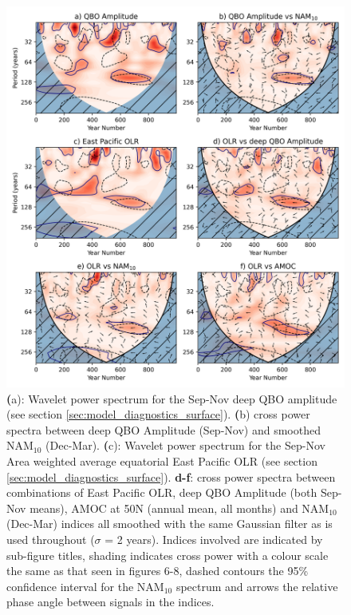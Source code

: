 \begin{figure}[h!]
\begin{center}
\noindent\includegraphics[width = 0.7\linewidth]{Figures/Figures-surface/OLR_wavelet.png}
\caption{\textbf(a): Wavelet power spectrum for the Sep-Nov deep QBO amplitude (see section \ref{sec:model_diagnostics_surface}). \textbf(b) cross power spectra between deep QBO Amplitude (Sep-Nov) and smoothed NAM$_{10}$ (Dec-Mar). \textbf(c): Wavelet power spectrum for the Sep-Nov  Area weighted average equatorial East Pacific OLR (see section \ref{sec:model_diagnostics_surface}). \textbf{d-f}: cross power spectra between combinations of East Pacific OLR, deep QBO Amplitude (both Sep-Nov means), AMOC at 50N (annual mean, all months) and NAM$_{10}$ (Dec-Mar) indices all smoothed with the same Gaussian filter as is used throughout ($\sigma$ = 2 years). Indices involved are indicated by sub-figure titles, shading indicates cross power with a colour scale the same as that seen in figures 6-8, dashed contours the 95\% confidence interval for the NAM$_{10}$ spectrum and arrows the relative phase angle between signals in the indices.}
\label{OLR_wavelet}
\end{center}
\end{figure}


